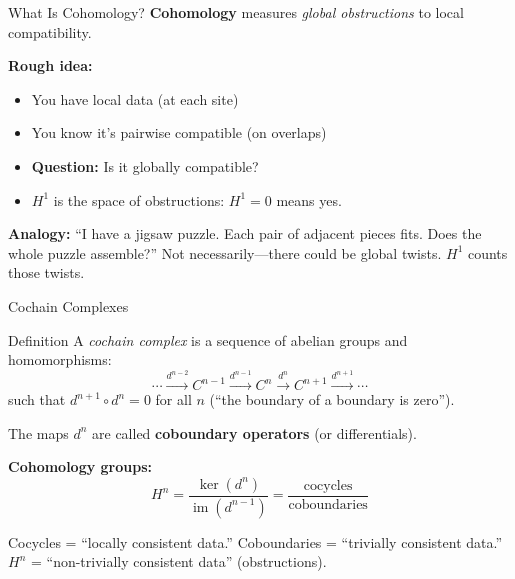 \documentclass[aspectratio=169,10pt]{beamer}
\newcommand{\im}{\operatorname{im}}
\begin{document}
\begin{frame}{What Is Cohomology?}
\textbf{Cohomology} measures \emph{global obstructions} to local compatibility.

\vspace{0.3em}
\textbf{Rough idea:}
\begin{itemize}
  \item You have local data (at each site)
  \item You know it's pairwise compatible (on overlaps)
  \item \textbf{Question:} Is it globally compatible?
  \item \textbf{$H^1$} is the space of obstructions: $H^1 = 0$ means yes.
\end{itemize}

\vspace{0.3em}
\textbf{Analogy:} ``I have a jigsaw puzzle. Each pair of adjacent pieces fits. Does the whole puzzle assemble?'' Not necessarily---there could be global twists. $H^1$ counts those twists.
\end{frame}

\begin{frame}{Cochain Complexes}
\begin{block}{Definition}
A \emph{cochain complex} is a sequence of abelian groups and homomorphisms:
\[
\cdots \xrightarrow{d^{n-2}} C^{n-1} \xrightarrow{d^{n-1}} C^n \xrightarrow{d^n} C^{n+1} \xrightarrow{d^{n+1}} \cdots
\]
such that $d^{n+1} \circ d^n = 0$ for all $n$ (``the boundary of a boundary is zero'').
\end{block}

The maps $d^n$ are called \textbf{coboundary operators} (or differentials).

\vspace{0.3em}
\textbf{Cohomology groups:}
\[
H^n = \frac{\ker(d^n)}{\im(d^{n-1})} = \frac{\text{cocycles}}{\text{coboundaries}}
\]

Cocycles = ``locally consistent data.'' Coboundaries = ``trivially consistent data.'' $H^n$ = ``non-trivially consistent data'' (obstructions).
\end{frame}
\end{document}
